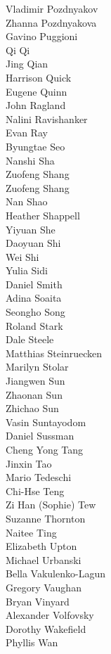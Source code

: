 Vladimir Pozdnyakov\\
Zhanna Pozdnyakova\\
Gavino Puggioni\\
Qi Qi\\
Jing Qian\\
Harrison  Quick\\
Eugene Quinn\\
John Ragland\\
Nalini Ravishanker\\
Evan Ray\\
Byungtae Seo\\
Nanshi Sha\\
Zuofeng Shang\\
Zuofeng Shang\\
Nan Shao\\
Heather Shappell\\
Yiyuan She\\
Daoyuan Shi\\
Wei Shi\\
Yulia Sidi\\
Daniel Smith\\
Adina Soaita\\
Seongho Song\\
Roland Stark\\
Dale Steele\\
Matthias Steinruecken\\
Marilyn Stolar\\
Jiangwen Sun\\
Zhaonan Sun\\
Zhichao Sun\\
Vasin  Suntayodom\\
Daniel Sussman\\
Cheng Yong Tang\\
Jinxin Tao\\
Mario  Tedeschi\\
Chi-Hse Teng\\
Zi Han (Sophie) Tew\\
Suzanne Thornton\\
Naitee Ting\\
Elizabeth Upton\\
Michael Urbanski\\
Bella Vakulenko-Lagun\\
Gregory Vaughan\\
Bryan Vinyard\\
Alexander Volfovsky\\
Dorothy Wakefield\\
Phyllis Wan\\
